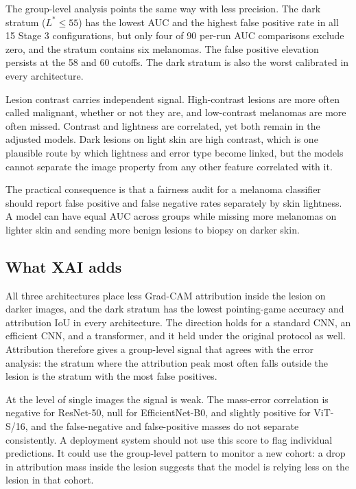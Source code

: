 The group-level analysis points the same way with less precision. The dark stratum ($L^*\leq55$) has the lowest AUC and the highest false positive rate in all 15 Stage 3 configurations, but only four of 90 per-run AUC comparisons exclude zero, and the stratum contains six melanomas. The false positive elevation persists at the 58 and 60 cutoffs. The dark stratum is also the worst calibrated in every architecture.

Lesion contrast carries independent signal. High-contrast lesions are more often called malignant, whether or not they are, and low-contrast melanomas are more often missed. Contrast and lightness are correlated, yet both remain in the adjusted models. Dark lesions on light skin are high contrast, which is one plausible route by which lightness and error type become linked, but the models cannot separate the image property from any other feature correlated with it.

The practical consequence is that a fairness audit for a melanoma classifier should report false positive and false negative rates separately by skin lightness. A model can have equal AUC across groups while missing more melanomas on lighter skin and sending more benign lesions to biopsy on darker skin.

\subsection{What XAI adds}

All three architectures place less Grad-CAM attribution inside the lesion on darker images, and the dark stratum has the lowest pointing-game accuracy and attribution IoU in every architecture. The direction holds for a standard CNN, an efficient CNN, and a transformer, and it held under the original protocol as well. Attribution therefore gives a group-level signal that agrees with the error analysis: the stratum where the attribution peak most often falls outside the lesion is the stratum with the most false positives.

At the level of single images the signal is weak. The mass-error correlation is negative for ResNet-50, null for EfficientNet-B0, and slightly positive for ViT-S/16, and the false-negative and false-positive masses do not separate consistently. A deployment system should not use this score to flag individual predictions. It could use the group-level pattern to monitor a new cohort: a drop in attribution mass inside the lesion suggests that the model is relying less on the lesion in that cohort.

